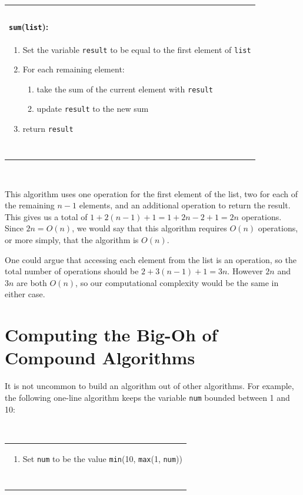 \documentclass[11pt,oneside]{book}
\theoremstyle{definition}
\begin{document}
\begin{tabular}{|p{\textwidth}|}
\hline
\ \\
\textbf{\huge \texttt{sum}(\texttt{list}):} \\
\begin{enumerate}[topsep=0pt]
    \item Set the variable \texttt{result} to be equal to the first element of \texttt{list}

    \item For each remaining element:
    \begin{enumerate}
        \item take the sum of the current element with \texttt{result}

        \item update \texttt{result} to the new sum
    \end{enumerate}

    \item return \texttt{result}
\end{enumerate} \\
\ \\
\hline
\end{tabular}

\

This algorithm uses one operation for the first element of the list, two for each of the remaining $n - 1$ elements, and an additional operation to return the result.
This gives us a total of $1 + 2(n - 1) + 1 = 1 + 2n - 2 + 1 = 2n$ operations.
Since $2n = O(n)$, we would say that this algorithm requires $O(n)$ operations, or more simply, that the algorithm is $O(n)$.

One could argue that accessing each element from the list is an operation, so the total number of operations should be $2 + 3(n - 1) + 1 = 3n$.
However $2n$ and $3n$ are both $O(n)$, so our computational complexity would be the same in either case.


\section{Computing the Big-Oh of Compound Algorithms}
It is not uncommon to build an algorithm out of other algorithms.
For example, the following one-line algorithm keeps the variable \texttt{num} bounded between 1 and 10:

\

\begin{tabular}{|p{\textwidth}|}
\hline
\begin{enumerate}[topsep=0pt]
    \item Set \texttt{num} to be the value \texttt{min}(10, \texttt{max}(1, \texttt{num}))
\end{enumerate} \\
\ \\
\hline
\end{tabular}
\end{document}
